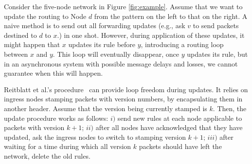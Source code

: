 Consider the five-node network in Figure \ref{fig:example}. Assume that we want to update the routing to Node $d$ from the pattern on the left to that on the right. A naive method is to send out all forwarding updates (e.g., ask $v$ to send packets destined to $d$ to $x$.) in one shot. However, during application of these updates, it might happen that $x$ updates its rule before $y$, introducing a routing loop between $x$ and $y$. This loop will eventually disappear, once $y$ updates its rule, but in an asynchronous system with possible message delays and losses, we cannot guarantee when this will happen.

Reitblatt et al.'s procedure~\cite{safeupdate} can provide loop freedom during updates. It  relies on ingress nodes stamping packets with version numbers, by encapsulating them in another header. Assume that the version being currently stamped is $k.$ Then, the update procedure works as follows: $i)$ send new rules at each node applicable to packets with version $k+1$; $ii)$ after all nodes have acknowledged that they have updated, ask the ingress nodes to switch to stamping version $k+1$; $iii)$ after waiting for a time during which all version $k$ packets should have left the network, delete the old rules.



